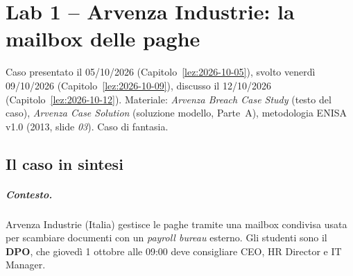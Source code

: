 \chapter{Lab 1 -- Arvenza Industrie: la mailbox delle paghe}
\label{lab:01}

\begin{nota}
Caso presentato il 05/10/2026 (Capitolo~\ref{lez:2026-10-05}), svolto venerdì 09/10/2026
(Capitolo~\ref{lez:2026-10-09}), discusso il 12/10/2026 (Capitolo~\ref{lez:2026-10-12}). Materiale:
\emph{Arvenza Breach Case Study} (testo del caso), \emph{Arvenza Case Solution} (soluzione modello,
Parte~A), metodologia ENISA v1.0 (2013, slide \emph{03}). Caso di fantasia.
\end{nota}

\section{Il caso in sintesi}

\paragraph{Contesto.} Arvenza Industrie (Italia) gestisce le paghe tramite una mailbox condivisa
usata per scambiare documenti con un \emph{payroll bureau} esterno. Gli studenti sono il
\textbf{DPO}, che giovedì 1 ottobre alle 09:00 deve consigliare CEO, HR Director e IT Manager.

